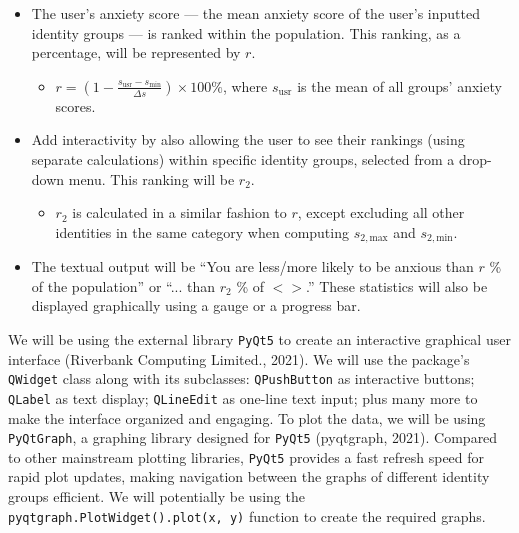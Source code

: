 \documentclass[fontsize=11pt]{article}
\begin{document}
\begin{itemize}
\begin{itemize}
            \item The user’s anxiety score — the mean anxiety score of the user’s inputted identity groups — is ranked within the population.
            This ranking, as a percentage, will be represented by $r$.

            \begin{itemize}
                \item $r = \left(1 - \frac{s_{\mathrm{usr}} - s_{\mathrm{min}}}{\Delta s}\right) \times 100 \%$, where $s_{\mathrm{usr}}$ is the mean of all groups’ anxiety scores.
            \end{itemize}

            \item Add interactivity by also allowing the user to see their rankings (using separate calculations) within specific identity groups, selected from a drop-down menu.
            This ranking will be $r_2$.

            \begin{itemize}
                \item $r_2$ is calculated in a similar fashion to $r$, except excluding all other identities in the same category when computing $s_{2,\mathrm{max}}$ and $s_{2,\mathrm{min}}$.
            \end{itemize}

            \item The textual output will be ``You are less/more likely to be anxious than $r$ \% of the population” or “... than $r_2$ \% of $<$$>$.” These statistics will also be displayed graphically using a gauge or a progress bar.

        \end{itemize}

    \end{itemize}

    We will be using the external library \texttt{PyQt5} to create an interactive graphical user interface (Riverbank Computing Limited., 2021).
    We will use the package’s \texttt{QWidget} class along with its subclasses: \texttt{QPushButton} as interactive buttons; \texttt{QLabel} as text display; \texttt{QLineEdit} as one-line text input;
    plus many more to make the interface organized and engaging.
    To plot the data, we will be using \texttt{PyQtGraph}, a graphing library designed for \texttt{PyQt5} (pyqtgraph, 2021).
    Compared to other mainstream plotting libraries, \texttt{PyQt5} provides a fast refresh speed for rapid plot updates, making navigation between the graphs of different identity groups efficient.
    We will potentially be using the \texttt{pyqtgraph.PlotWidget().plot(x, y)} function to create the required graphs.
\end{document}
